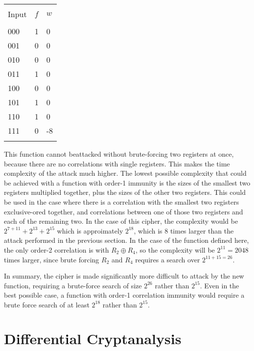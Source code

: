\documentclass[british,11pt,a4paper]{article}
\begin{document}
\begin{center}
  \begin{tabular}{@{}lll@{}}\label{tab:walsh2} \\
    \toprule \\
    Input & \(f\) & \(w\) \\
    \midrule \\
    000 & 1 & 0 \\
    001 & 0 & 0 \\
    010 & 0 & 0 \\
    011 & 1 & 0 \\
    100 & 0 & 0 \\
    101 & 1 & 0 \\
    110 & 1 & 0 \\
    111 & 0 & -8 \\
    \bottomrule \\
  \end{tabular}
\end{center}
This function cannot beattacked without brute-forcing two registers at once,
because there are no correlations with single registers. This makes the time
complexity of the attack much higher. The lowest possible complexity that could be achieved with a function with order-1 immunity is the sizes of the smallest two registers multiplied together, plus the sizes of the other two registers. This could be used in the case where there is a correlation with the smallest two registers exclusive-ored together, and correlations between one of those two registers and each of the remaining two. In the case of this cipher, the complexity would be \(2^{7+11} + 2^{13} + 2^{15}\) which is approimately \(2^{18}\), which is 8 times larger than the attack performed in the previous section. In the case of the function defined here, the only order-2 correlation is with \(R_2 \oplus R_4\), so the complexity will be \(2^{11} = 2048\) times larger, since brute forcing \(R_2\) and \(R_4\) requires a search over \(2^{11 + 15 = 26}\).

In summary, the cipher is made significantly more difficult to attack by the new function, requiring a brute-force search of size \(2^{26}\) rather than \(2^{15}\). Even in the best possible case, a function with order-1 correlation immunity would require a brute force search of at least \(2^{18}\) rather than \(2^{15}\).

\clearpage
\section{Differential Cryptanalysis}
\end{document}
